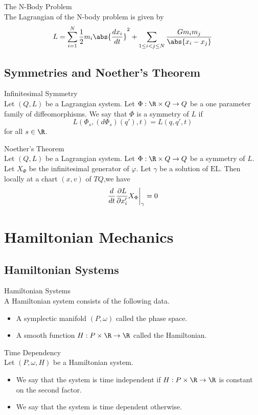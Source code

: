 \documentclass[a4paper]{article}
\begin{document}
\begin{eg}{The N-Body Problem}{}\\
The Lagrangian of the N-body problem is given by $$L=\sum_{i=1}^N\frac{1}{2}m_i\abs{\frac{dx_i}{dt}}^2+\sum_{1\leq i<j\leq N}\frac{Gm_im_j}{\abs{x_i-x_j}}$$
\end{eg}

\subsection{Symmetries and Noether's Theorem}
\begin{defn}{Infinitesimal Symmetry}{}\\
Let $(Q,L)$ be a Lagrangian system. Let $\Phi:\R\times Q\to Q$ be a one parameter family of diffeomorphisms. We say that $\Phi$ is a symmetry of $L$ if $$L(\Phi_s,(d\Phi_s)(q'),t)=L(q,q',t)$$ for all $s\in\R$. 
\end{defn}

\begin{thm}{Noether's Theorem}{}\\
Let $(Q,L)$ be a Lagrangian system. Let $\Phi:\R\times Q\to Q$ be a symmetry of $L$. Let $X_\Phi$ be the infinitesimal generator of $\varphi$. Let $\gamma$ be a solution of $\text{EL}$. Then locally at a chart $(x,v)$ of $TQ$,we have $$\frac{d}{dt}\frac{\partial L}{\partial x_i'}X_\Phi\bigg{|}_{\gamma}=0$$
\end{thm}

\pagebreak
\section{Hamiltonian Mechanics}
\subsection{Hamiltonian Systems}
\begin{defn}{Hamiltonian Systems}{}\\
A Hamiltonian system consists of the following data. 
\begin{itemize}
\item A symplectic manifold $(P,\omega)$ called the phase space. 
\item A smooth function $H:P\times\R\to\R$ called the Hamiltonian. 
\end{itemize}
\end{defn}

\begin{defn}{Time Dependency}{}\\
Let $(P,\omega,H)$ be a Hamiltonian system. 
\begin{itemize}
\item We say that the system is time independent if $H:P\times\R\to\R$ is constant on the second factor. 
\item We say that the system is time dependent otherwise. 
\end{itemize}
\end{defn}
\end{document}

